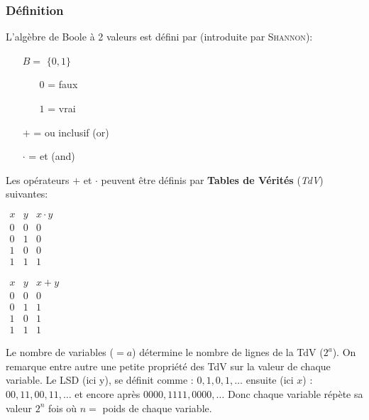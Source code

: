 \subsubsection{Définition}
L'algèbre de Boole à 2 valeurs est défini par (introduite par \textsc{Shannon}):
\begin{itemize}
	\item[$B=$]$\{0,1\}$
	\begin{itemize}
		\item[$0$]= faux
		\item[$1$]= vrai
	\end{itemize}
	\item[$+$]= ou inclusif (or)
	\item[$\cdot$]= et (and)
\end{itemize}
Les opérateurs $+$ et $\cdot$ peuvent être définis par \textbf{Tables de Vérités} (\textit{TdV}) suivantes:
\begin{table}[H]
	\begin{minipage}{0.5\textwidth}
		\centering
	$\begin{array}{c|c|c}
		x & y &  x\cdot y\\
		\hline
		0 & 0 & 0\\
		0 & 1 & 0\\
		1 & 0 & 0\\
		1 & 1 & 1
	\end{array}$
	\end{minipage}
	\begin{minipage}{0.5\textwidth}
		\centering
		$\begin{array}{c|c|c}
		x & y &  x+y\\
		\hline
		0 & 0 & 0\\
		0 & 1 & 1\\
		1 & 0 & 1\\
		1 & 1 & 1
		\end{array}$
	\end{minipage}
\end{table}
Le nombre de variables ($=a$) détermine le nombre de lignes de la TdV ($2^a$). On remarque entre autre une petite propriété des TdV sur la valeur de chaque variable. Le LSD (ici y), se définit comme : $0,1,0,1,\dots$ ensuite (ici $x$) : $00,11,00,11,\dots$ et encore après $0000,1111,0000,\dots$ Donc chaque variable répète sa valeur $2^n$ fois où $n=$ poids de chaque variable.
